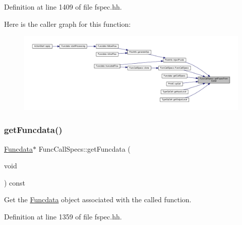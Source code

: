 Definition at line 1409 of file fspec.\+hh.

Here is the caller graph for this function\+:
\nopagebreak
\begin{figure}[H]
\begin{center}
\leavevmode
\includegraphics[width=350pt]{class_func_call_specs_aa1d084c81a9ae8656d7ef79c84398dc8_icgraph}
\end{center}
\end{figure}
\mbox{\label{class_func_call_specs_a860b42c7f272e40dae078854e101b6bc}} 
\subsubsection{\texorpdfstring{getFuncdata()}{getFuncdata()}}
{\footnotesize\ttfamily \mbox{\hyperlink{class_funcdata}{Funcdata}}$\ast$ Func\+Call\+Specs\+::get\+Funcdata (\begin{DoxyParamCaption}\item[{void}]{ }\end{DoxyParamCaption}) const\hspace{0.3cm}{\ttfamily [inline]}}



Get the \mbox{\hyperlink{class_funcdata}{Funcdata}} object associated with the called function. 



Definition at line 1359 of file fspec.\+hh.

